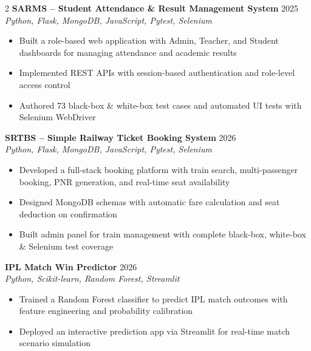 \documentclass[10pt,a4paper]{article}
\begin{document}
\begin{paracol}{2}
{\small\textbf{SARMS -- Student Attendance \& Result Management System}
\hfill{\footnotesize\color{darkgray}2025}\\
{\footnotesize\color{darkgray}\textit{Python, Flask, MongoDB, JavaScript, Pytest, Selenium}}}
\begin{itemize}
  \item Built a role-based web application with Admin, Teacher, and Student dashboards for managing attendance and academic results
  \item Implemented REST APIs with session-based authentication and role-level access control
  \item Authored 73 black-box \& white-box test cases and automated UI tests with Selenium WebDriver
\end{itemize}

\vspace{3pt}
{\small\textbf{SRTBS -- Simple Railway Ticket Booking System}
\hfill{\footnotesize\color{darkgray}2026}\\
{\footnotesize\color{darkgray}\textit{Python, Flask, MongoDB, JavaScript, Pytest, Selenium}}}
\begin{itemize}
  \item Developed a full-stack booking platform with train search, multi-passenger booking, PNR generation, and real-time seat availability
  \item Designed MongoDB schemas with automatic fare calculation and seat deduction on confirmation
  \item Built admin panel for train management with complete black-box, white-box \& Selenium test coverage
\end{itemize}

\vspace{3pt}
{\small\textbf{IPL Match Win Predictor}
\hfill{\footnotesize\color{darkgray}2026}\\
{\footnotesize\color{darkgray}\textit{Python, Scikit-learn, Random Forest, Streamlit}}}
\begin{itemize}
  \item Trained a Random Forest classifier to predict IPL match outcomes with feature engineering and probability calibration
  \item Deployed an interactive prediction app via Streamlit for real-time match scenario simulation
\end{itemize}

\end{paracol}
\end{document}
